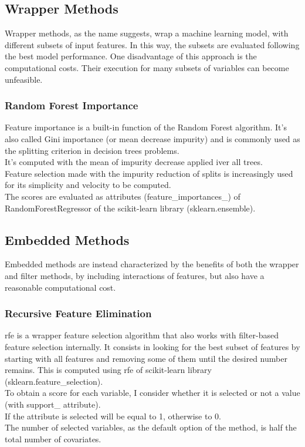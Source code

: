 \subsection{Wrapper Methods}
Wrapper methods, as the name suggests, wrap a machine learning model, with different subsets of input features. In this way, the subsets are evaluated following the best model performance.
One disadvantage of this approach is the computational costs.\newline
Their execution for many subsets of variables can become unfeasible. 
\subsubsection{Random Forest Importance}
Feature importance is a built-in function of the Random Forest algorithm. It's also called Gini importance (or mean decrease impurity) and is commonly used as the splitting criterion in decision trees problems. \\
It's computed with the mean of impurity decrease applied iver all trees. \\ 
Feature selection made with the impurity reduction of splits is increasingly used for its simplicity and velocity to be computed.\\
The scores are evaluated as attributes (feature\_importances\_) of RandomForestRegressor of the scikit-learn library (sklearn.ensemble).
\bigbreak
\subsection{Embedded Methods}
Embedded methods are instead characterized by the benefits of both the wrapper and filter methods, by including interactions of features, but also have a reasonable computational cost.
\subsubsection{Recursive Feature Elimination}
\gls{rfe} is a wrapper feature selection algorithm that also works with filter-based feature selection internally.\newline
It consists in looking for the best subset of features by starting with all features and removing some of them until the desired number remains.\newline
This is computed using \acrshort{rfe} of scikit-learn library (sklearn.feature\_selection).\\
To obtain a score for each variable, I consider whether it is selected or not a value (with support\_ attribute).\\
If the attribute is selected will be equal to 1, otherwise to 0.\\
The number of selected variables, as the default option of the method, is half the total number of covariates.
\pagebreak
